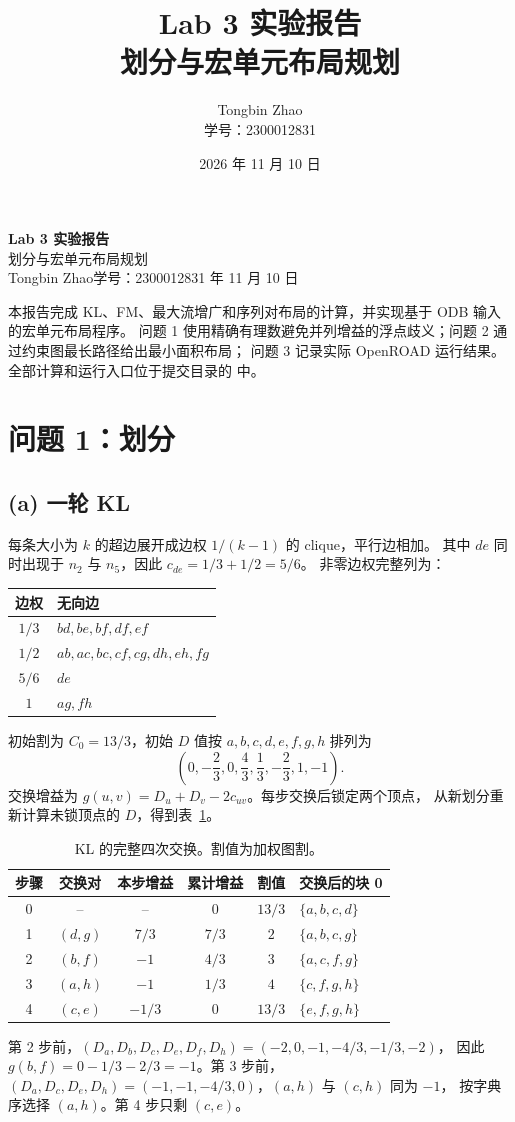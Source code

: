 \documentclass[UTF8,a4paper,11pt,fontset=fandol]{ctexart}
\title{Lab 3 实验报告\\\large 划分与宏单元布局规划}
\author{Tongbin Zhao\\学号：2300012831}
\date{2026 年 11 月 10 日}
\newcommand{\code}[1]{\texttt{\detokenize{#1}}}
\begin{document}
\pagestyle{plain}
\begin{center}
{\LARGE\bfseries Lab 3 实验报告}\\[.4em]
{\large 划分与宏单元布局规划}\\[.6em]
Tongbin Zhao\quad 学号：2300012831 年 11 月 10 日
\end{center}
本报告完成 KL、FM、最大流增广和序列对布局的计算，并实现基于 ODB 输入的宏单元布局程序。
问题 1 使用精确有理数避免并列增益的浮点歧义；问题 2 通过约束图最长路径给出最小面积布局；
问题 3 记录实际 OpenROAD 运行结果。全部计算和运行入口位于提交目录的 \code{src/} 中。

\section{问题 1：划分}
\subsection{(a) 一轮 KL}
每条大小为 $k$ 的超边展开成边权 $1/(k-1)$ 的 clique，平行边相加。
其中 $de$ 同时出现于 $n_2$ 与 $n_5$，因此 $c_{de}=1/3+1/2=5/6$。
非零边权完整列为：
\begin{center}
\begin{tabular}{cl}
\toprule
边权 & 无向边 \\\midrule
$1/3$ & $bd,be,bf,df,ef$ \\
$1/2$ & $ab,ac,bc,cf,cg,dh,eh,fg$ \\
$5/6$ & $de$ \\
$1$ & $ag,fh$ \\\bottomrule
\end{tabular}
\end{center}
初始割为 $C_0=13/3$，初始 $D$ 值按 $a,b,c,d,e,f,g,h$ 排列为
\[
\left(0,-\frac23,0,\frac43,\frac13,-\frac23,1,-1\right).
\]
交换增益为 $g(u,v)=D_u+D_v-2c_{uv}$。每步交换后锁定两个顶点，
从新划分重新计算未锁顶点的 $D$，得到表~\ref{tab:kl}。
\begin{table}[H]\centering
\caption{KL 的完整四次交换。割值为加权图割。}\label{tab:kl}
\begin{tabular}{cccccl}
\toprule
步骤 & 交换对 & 本步增益 & 累计增益 & 割值 & 交换后的块 0 \\\midrule
0 & -- & -- & $0$ & $13/3$ & $\{a,b,c,d\}$ \\
1 & $(d,g)$ & $7/3$ & $7/3$ & $2$ & $\{a,b,c,g\}$ \\
2 & $(b,f)$ & $-1$ & $4/3$ & $3$ & $\{a,c,f,g\}$ \\
3 & $(a,h)$ & $-1$ & $1/3$ & $4$ & $\{c,f,g,h\}$ \\
4 & $(c,e)$ & $-1/3$ & $0$ & $13/3$ & $\{e,f,g,h\}$ \\\bottomrule
\end{tabular}
\end{table}
第 2 步前，$(D_a,D_b,D_c,D_e,D_f,D_h)=(-2,0,-1,-4/3,-1/3,-2)$，
因此 $g(b,f)=0-1/3-2/3=-1$。第 3 步前，
$(D_a,D_c,D_e,D_h)=(-1,-1,-4/3,0)$，$(a,h)$ 与 $(c,h)$ 同为 $-1$，
按字典序选择 $(a,h)$。第 4 步只剩 $(c,e)$。
\end{document}
